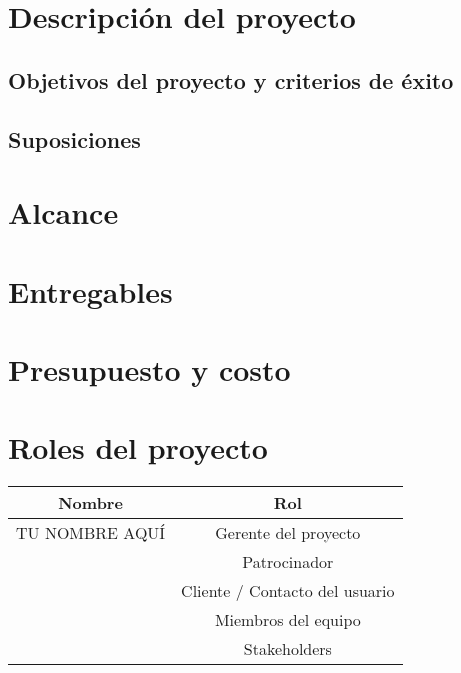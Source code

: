 \documentclass[12pt]{charter}
\begin{document}
\maketitle
\thispagestyle{empty}
\newpage

\section*{Descripción del proyecto}
\label{sec:description}

	\subsection*{Objetivos del proyecto y criterios de éxito}
	\label{subsec:objandsuccess}
	
	\subsection*{Suposiciones}
	\label{subsec:assumptions}

\section*{Alcance}
\label{sec:scope}

\section*{Entregables}
\label{sec:deliverables}

\section*{Presupuesto y costo}
\label{sec:budgetcost}

\section*{Roles del proyecto}
\label{sec:roles}
\begin{table}[h]
  \label{tbl:roles}
  \begin{center}
    \begin{tabular}{c|c}
      Nombre & Rol\\\hline
      TU NOMBRE AQUÍ & Gerente del proyecto\\\hline
      & Patrocinador\\\hline
      & Cliente / Contacto del usuario\\\hline
      & Miembros del equipo\\\hline
      & Stakeholders\\\hline
    \end{tabular}
  \end{center}
\end{table}
\end{document}
